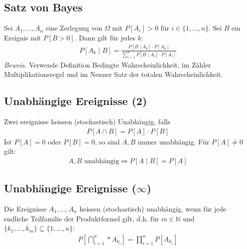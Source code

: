 \documentclass[8pt]{extarticle}
\newcommand{\N}{\mathbb{N}}
\newcommand{\Sn}{\sum_{i = 1}^n}
\newcommand{\Pn}{\prod_{i = 1}^n}
\newcommand{\cond}[2]{P[#1 \; | \; #2]}
\newcommand{\ereignisse}{A_1, \dots, A_n}
\newcommand{\bigsubsection}{\bigcap_{i = 1}^n}
\begin{document}
\begin{multicols*}{3}
  \subsection*{Satz von Bayes}
  Sei $A_1, \dots, A_n$ eine Zerlegung von $\Omega$ mit $P[A_i] > 0$ für $i \in
    \{1, \dots, n\}$. Sei $B$ ein Ereignis mit $P[B > 0]$. Dann gilt für jedes $k$:
  \begin{align*}
    \cond{A_k}{B} = \frac{\cond{B}{A_k} \cdot P[A_k] }{\Sn \cond{B}{A_i} \cdot P[A_i]}
  \end{align*}
  \emph{Beweis.} Verwende Definition Bedingte Wahrscheinlichkeit,
  im Zähler Multiplikationsregel und im Nenner Satz der totalen Wahrscheinlichkeit.
  \subsection*{Unabhängige Ereignisse  (2)}
  Zwei ereignisse heissen  (stochastisch) Unabhängig, falls
  \begin{align*}
    P[A \cap B] = P[A] \cdot P[B]
  \end{align*}
  Ist $P[A] = 0$ oder $P[B] = 0$, so sind $A, B$ immer unabhängig.
  Für $P[A] \neq 0$ gilt:
  \begin{align*}
    A, B \text{ unabhängig} \Longleftrightarrow \cond{A}{B} = P[A]
  \end{align*}
  \subsection*{Unabhängige Ereignisse  ($\infty$)}
  Die Ereignisse $\ereignisse$ heissen  (stochastisch) unabhängig, wenn für jede
  endliche Teilfamilie der Produktformel gilt, d.h. für $m \in \N$ und $\{k_1,
    \dots, k_m\} \subseteq \{1, \dots, n\}$:
  \begin{align*}
    P \left[\bigsubsection* A_{k_i} \right] = \Pn P[A_{k_i}]
  \end{align*}

\end{multicols*}
\end{document}
